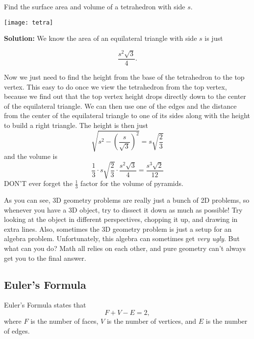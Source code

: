 \begin{problem}
Find the surface area and volume of a tetrahedron with side $s$.
\begin{center}
\texttt{[image: tetra]}
\end{center}
\end{problem}

\textbf{Solution:}
We know the area of an equilateral triangle with side $s$ is just

$$\frac{s^2\sqrt{3}}{4}.$$

Now we just need to find the height from the base of the tetrahedron to the top vertex. This easy to do once we view the tetrahedron from the top vertex, because we find out that the top vertex height drops directly down to the center of the equilateral triangle. We can then use one of the edges and the distance from the center of the equilateral triangle to one of its sides along with the height to build a right triangle. The height is then just 
$$\sqrt{s^2-\left(\frac{s}{\sqrt{3}}\right)^2}=s\sqrt{\frac{2}{3}}$$
and the volume is 
$$\frac{1}{3}\cdot s\sqrt{\frac{2}{3}}\cdot \frac{s^2\sqrt{3}}{4} = \boxed{\frac{s^3\sqrt{2}}{12}}$$
DON'T ever forget the $\frac{1}{3}$ factor for the volume of pyramids.

As you can see, 3D geometry problems are really just a bunch of 2D problems, so whenever you have a 3D object, try to dissect it down as much as possible! Try looking at the object in different perspectives, chopping it up, and drawing in extra lines. Also, sometimes the 3D geometry problem is just a setup for an algebra problem. Unfortunately, this algebra can sometimes get \textit{very ugly}. But what can you do? Math all relies on each other, and pure geometry can't always get you to the final answer.


\subsection{Euler's Formula} %
Euler's Formula states that 
\begin{equation}
    F+V-E=2,
\end{equation}
where $F$ is the number of faces, $V$ is the number of vertices, and $E$ is the number of edges.

